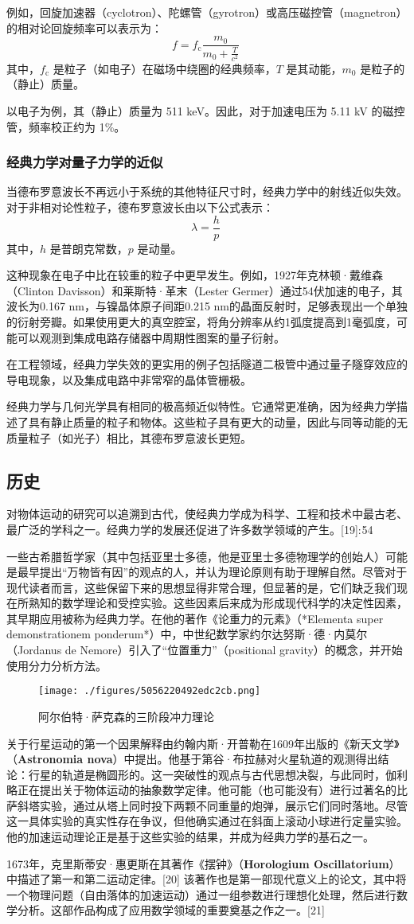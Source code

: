例如，回旋加速器（cyclotron）、陀螺管（gyrotron）或高压磁控管（magnetron）的相对论回旋频率可以表示为：  
\[
f = f_{\mathrm{c}} \frac{m_0}{m_0 + \frac{T}{c^2}}~
\]  
其中，\( f_{\mathrm{c}} \) 是粒子（如电子）在磁场中绕圈的经典频率，\( T \) 是其动能，\( m_0 \) 是粒子的（静止）质量。  

以电子为例，其（静止）质量为 511 keV。因此，对于加速电压为 5.11 kV 的磁控管，频率校正约为 1\%。

\subsubsection{经典力学对量子力学的近似}  
当德布罗意波长不再远小于系统的其他特征尺寸时，经典力学中的射线近似失效。对于非相对论性粒子，德布罗意波长由以下公式表示：  
\[
\lambda = \frac{h}{p}~
\]  
其中，\( h \) 是普朗克常数，\( p \) 是动量。  

这种现象在电子中比在较重的粒子中更早发生。例如，1927年克林顿·戴维森（Clinton Davisson）和莱斯特·革末（Lester Germer）通过54伏加速的电子，其波长为0.167 nm，与镍晶体原子间距0.215 nm的晶面反射时，足够表现出一个单独的衍射旁瓣。如果使用更大的真空腔室，将角分辨率从约1弧度提高到1毫弧度，可能可以观测到集成电路存储器中周期性图案的量子衍射。  

在工程领域，经典力学失效的更实用的例子包括隧道二极管中通过量子隧穿效应的导电现象，以及集成电路中非常窄的晶体管栅极。  

经典力学与几何光学具有相同的极高频近似特性。它通常更准确，因为经典力学描述了具有静止质量的粒子和物体。这些粒子具有更大的动量，因此与同等动能的无质量粒子（如光子）相比，其德布罗意波长更短。

\subsection{历史}  
对物体运动的研究可以追溯到古代，使经典力学成为科学、工程和技术中最古老、最广泛的学科之一。经典力学的发展还促进了许多数学领域的产生。[19]: 54  

一些古希腊哲学家（其中包括亚里士多德，他是亚里士多德物理学的创始人）可能是最早提出“万物皆有因”的观点的人，并认为理论原则有助于理解自然。尽管对于现代读者而言，这些保留下来的思想显得非常合理，但显著的是，它们缺乏我们现在所熟知的数学理论和受控实验。这些因素后来成为形成现代科学的决定性因素，其早期应用被称为经典力学。在他的著作《论重力的元素》（*Elementa super demonstrationem ponderum*）中，中世纪数学家约尔达努斯·德·内莫尔（Jordanus de Nemore）引入了“位置重力”（positional gravity）的概念，并开始使用分力分析方法。
\begin{figure}[ht]
\centering
\texttt{[image: ./figures/5056220492edc2cb.png]}
\caption{阿尔伯特·萨克森的三阶段冲力理论} \label{fig_JDLX_4}
\end{figure}
关于行星运动的第一个因果解释由约翰内斯·开普勒在1609年出版的《新天文学》（\textbf{Astronomia nova}）中提出。他基于第谷·布拉赫对火星轨道的观测得出结论：行星的轨道是椭圆形的。这一突破性的观点与古代思想决裂，与此同时，伽利略正在提出关于物体运动的抽象数学定律。他可能（也可能没有）进行过著名的比萨斜塔实验，通过从塔上同时投下两颗不同重量的炮弹，展示它们同时落地。尽管这一具体实验的真实性存在争议，但他确实通过在斜面上滚动小球进行定量实验。他的加速运动理论正是基于这些实验的结果，并成为经典力学的基石之一。

1673年，克里斯蒂安·惠更斯在其著作《摆钟》（\textbf{Horologium Oscillatorium}）中描述了第一和第二运动定律。[20] 该著作也是第一部现代意义上的论文，其中将一个物理问题（自由落体的加速运动）通过一组参数进行理想化处理，然后进行数学分析。这部作品构成了应用数学领域的重要奠基之作之一。[21]